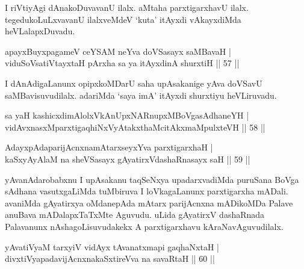 \begin{artha} 
I riVtiyAgi dAnakoDuvavanU ilalx. aMtaha parxtigarxhavU ilalx. 
tegedukoLuLxvavanU ilalxveMdeV `kuta' itAyxdi vAkayxdiMda\break 
heVLalapxDuvadu.
\end{artha}


\begin{shl}
apayxBuyxpagameV ceYSAM neYva doVSasayx saMBavaH | \\
viduSoV\s satiVtayxtaH pArxha sa ya itAyxdinA shurxtiH \hfill ||  57 || 
\end{shl}

\begin{artha} 
I dAnAdigaLanunx opipxkoMDarU saha upAsakanige yAva doVSavU 
saMBavisuvudilalx. adariMda `saya imA' itAyxdi shurxtiyu heVLiruvadu.
\end{artha}


\begin{shl}
sa yaH kashicxdimAlolxVkAnUpxNARnupxMBoVgasAdhaneYH | \\
vidAvxnasxMparxtigaqhiNxVyAtakxthaMcitAkxmaMpulxteVH \hfill ||  58 || 
\end{shl}

\begin{shl}
AdayxpAdaparijAcnxnamAtarxseyxYva parxtigarxhaH  | \\
kaSxyAyAlaM na sheVSasayx gAyatirxVdashaRnasayx saH \hfill ||  59 || 
\end{shl}

\begin{artha} 
yAvanAdarobabxnu I upAsakanu taqSeNxya upadarxvadiMda puruSana BoVga 
sAdhana vasutxgaLiMda tuMbiruva I loVkagaLanunx parxtigarxha mADali. 
avaniMda gAyatirxya oMdanepAda mAtarx parijAcnxna mADikoMDa Palave 
anuBava mADalapxTaTxMte Aguvudu. uLida gAyatirxV dashaRnada Palavanunx 
nAshagoLisuvudakekx A parxtigarxhavu kAraNavAguvudilalx.
\end{artha}


\begin{shl}
yAvatiVyaM tarxyiV vidAyx tAvanatxmapi gaqhaNxtaH | \\
divxtiVyapadavijAcnxnakaSxtireVva na savaRtaH \hfill ||  60 || 
\end{shl}


